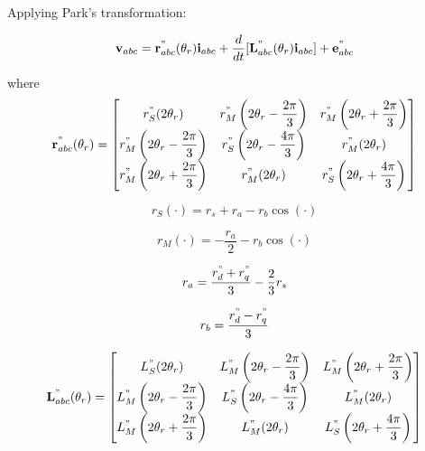Applying Park's transformation:

\begin{equation} \label{eq:StatorVol}
 \mathbf{v}_{abc} =  \mathbf{r}_{abc}^" (\theta_r) \mathbf{i}_{abc} + \frac{d}{dt} [ \mathbf{L}_{abc}^" (\theta_r)  \mathbf{i}_{abc} ] +  \mathbf{e}_{abc}^"
\end{equation}

where
\begin{equation}
 \mathbf{r}_{abc}^"(\theta_r) = 
\begin{bmatrix}
r_S^"(2 \theta_r) & r_M^" \left( 2 \theta_r - \dfrac{2 \pi}{3} \right) & r_M^" \left( 2 \theta_r +  \dfrac{2 \pi}{3} \right) \\
r_M^" \left( 2 \theta_r - \dfrac{2 \pi}{3} \right) & r_S^" \left( 2 \theta_r - \dfrac{4 \pi}{3} \right) & r_M^"(2 \theta_r) \\
r_M^" \left( 2 \theta_r + \dfrac{2 \pi}{3} \right) & r_M^"(2 \theta_r) & r_S^" \left( 2 \theta_r + \dfrac{4 \pi}{3} \right)
\end{bmatrix}
\end{equation}

\begin{equation}
r_S(\cdot) = r_s + r_a - r_b \cos (\cdot)
\end{equation}

\begin{equation}
r_M(\cdot) = - \frac{r_a}{2} - r_b \cos (\cdot)
\end{equation}

\begin{equation}
r_a = \frac{r_d^" + r_q^"}{3} - \frac{2}{3}r_s
\end{equation}

\begin{equation}
r_b = \frac{r_d^" - r_q^"}{3}
\end{equation}

\begin{equation}
 \mathbf{L}_{abc}^"(\theta_r) = 
\begin{bmatrix}
L_S^"(2 \theta_r) & L_M^" \left( 2 \theta_r - \dfrac{2 \pi}{3} \right) & L_M^" \left( 2 \theta_r +  \dfrac{2 \pi}{3} \right) \\
L_M^" \left( 2 \theta_r - \dfrac{2 \pi}{3} \right) & L_S^" \left( 2 \theta_r - \dfrac{4 \pi}{3} \right) & L_M^"(2 \theta_r) \\
L_M^" \left( 2 \theta_r + \dfrac{2 \pi}{3} \right) & L_M^"(2 \theta_r) & L_S^" \left( 2 \theta_r + \dfrac{4 \pi}{3} \right)
\end{bmatrix}
\end{equation}


